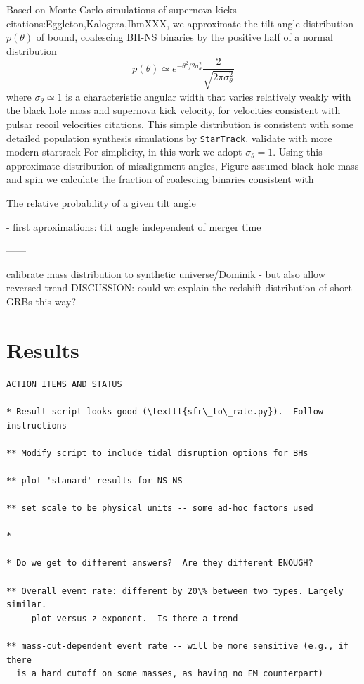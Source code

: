\documentclass[nofootinbib,twocolumn,prd]{emulateapj}
\newcommand\editremark[1]{{\color{red}#1}}
\begin{document}
Based on Monte Carlo simulations of supernova kicks \editremark{citations:Eggleton,Kalogera,IhmXXX}, we approximate the tilt angle distribution $p(\theta)$ of bound,
coalescing BH-NS binaries by the positive half of a normal distribution
\[
p(\theta)\simeq e^{-\theta^2/2\sigma_\theta^2} \frac{2}{\sqrt{2\pi \sigma_\theta^2}}
\]
where $\sigma_{\theta}\simeq 1$ is a characteristic angular width that varies relatively weakly with the black hole mass
and supernova kick velocity, for velocities consistent with pulsar recoil velocities \editremark{citations}.  This simple distribution is consistent with some detailed population synthesis simulations by
\texttt{StarTrack}. \editremark{validate with more modern startrack}  
For simplicity, in this work we adopt $\sigma_{\theta}=1$.   
Using this approximate distribution of misalignment angles, Figure  assumed black hole mass and spin we calculate the
fraction of coalescing binaries consistent with 



The relative probability of a given tilt angle

- first aproximations: tilt angle independent of merger time






------

\editremark{calibrate mass distribution to synthetic universe/Dominik - but also allow reversed trend}
DISCUSSION: could we explain the redshift distribution of short GRBs this way?


\section{Results}
\label{sec:results}


\begin{verbatim}
ACTION ITEMS AND STATUS

* Result script looks good (\texttt{sfr\_to\_rate.py}).  Follow instructions

** Modify script to include tidal disruption options for BHs

** plot 'stanard' results for NS-NS

** set scale to be physical units -- some ad-hoc factors used

*

* Do we get to different answers?  Are they different ENOUGH?  

** Overall event rate: different by 20\% between two types. Largely similar.
   - plot versus z_exponent.  Is there a trend

** mass-cut-dependent event rate -- will be more sensitive (e.g., if there
  is a hard cutoff on some masses, as having no EM counterpart)
\end{verbatim}
\end{document}
